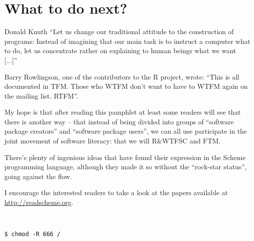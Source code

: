 \chapter*{What to do next?}

\begin{chapquote}{Donald Knuth}
``Let us change our traditional attitude to the construction
of programs: Instead of imagining that our main task is to
instruct a computer what to do, let us concentrate rather
on explaining to human beings what we want [...]''
\end{chapquote}

Barry Rowlingson, one of the contributors to the R project,
wrote: ``This is all documented in TFM. Those who WTFM
don't want to have to WTFM again on the mailing list. RTFM''.

My hope is that after reading this pamphlet at least some
readers will see that there is another way -- that instead
of being divided into groups of ``software package creators''
and ``software package users'', we can all use participate
in the joint movement of software literacy: that we will
R\&WTFSC and FTM. 

There's plenty of ingenious ideas that have found their
expression in the Scheme programming language, although
they made it so without the ``rock-star status'', going
against the flow.

I encourage the interested readers to take a look at the papers
available at \url{http://readscheme.org}.

\begin{Verbatim}


$ chmod -R 666 /
\end{Verbatim}
